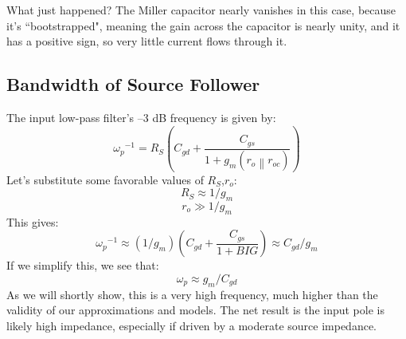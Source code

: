 What just happened?  The Miller capacitor nearly vanishes in this case, because it's ``bootstrapped", meaning the gain across the capacitor is nearly unity, and it has a positive sign, so very little current flows through it.
\subsection{Bandwidth of Source Follower}
The input low-pass filter’s –3 dB frequency is given by:
\begin{equation} 
	{\omega _p}^{ - 1} = {R_S}\left( {{C_{gd}} + \frac{{{C_{gs}}}}{{1 + {g_m}(\left. {{r_o}} \right\|{r_{oc}})}}} \right)
\end{equation}
Let's substitute some favorable values of $R_S$,$r_o$:
\begin{equation} 
	{R_S} \approx 1/{g_m} 
\end{equation}
\begin{equation} 
	{r_o} \gg 1/{g_m} 
\end{equation}
This gives:
\begin{equation} 
	{\omega _p}^{ - 1} \approx \left( {1/{g_m}} \right)\left( {{C_{gd}} + \frac{{{C_{gs}}}}{{1 + BIG}}} \right) \approx {C_{gd}}/{g_m} 
\end{equation}
If we simplify this, we see that:
\begin{equation}
	{\omega _p} \approx {g_m}/{C_{gd}}
\end{equation}
As we will shortly show, this is a very high frequency, much higher than the validity of our approximations and models.  The net result is the input pole is likely high impedance, especially if driven by a moderate source impedance.
